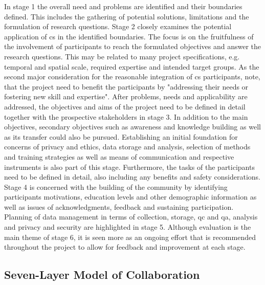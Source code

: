 In stage 1 the overall need and problems are identified and their boundaries defined. This includes the gathering of potential solutions, limitations and the formulation of research questions. Stage 2 closely examines the potential application of \acrshort{cs} in the identified boundaries. The focus is on the fruitfulness of the involvement of participants to reach the formulated objectives and answer the research questions. This may be related to many project specifications, e.g. temporal and spatial scale, required expertise and intended target groups. As the second major consideration for the reasonable integration of \acrshort{cs} participants, \autocite[2]{fraislCitizenScienceEnvironmental2022} note, that the project need to benefit the participants by "addressing their needs or fostering new skill and expertise". After problems, needs and applicability are addressed, the objectives and aims of the project need to be defined in detail together with the prospective stakeholders in stage 3. In addition to the main objectives, secondary objectives such as awareness and knowledge building as well as its transfer could also be pursued. Establishing an initial foundation for concerns of privacy and ethics, data storage and analysis, selection of methods and training strategies as well as means of communication and respective instruments is also part of this stage. Furthermore, the tasks of the participants need to be defined in detail, also including any benefits and safety considerations. Stage 4 is concerned with the building of the community by identifying participants motivations, education levels and other demographic information as well as issues of acknowledgments, feedback and sustaining participation. Planning of data management in terms of collection, storage, \acrfull{qc} and \acrfull{qa}, analysis and privacy and security are highlighted in stage 5. Although evaluation is the main theme of stage 6, it is seen more as an ongoing effort that is recommended throughout the project to allow for feedback and improvement at each stage.\newline

\subsection{Seven-Layer Model of Collaboration}\label{subsec:slmc}

